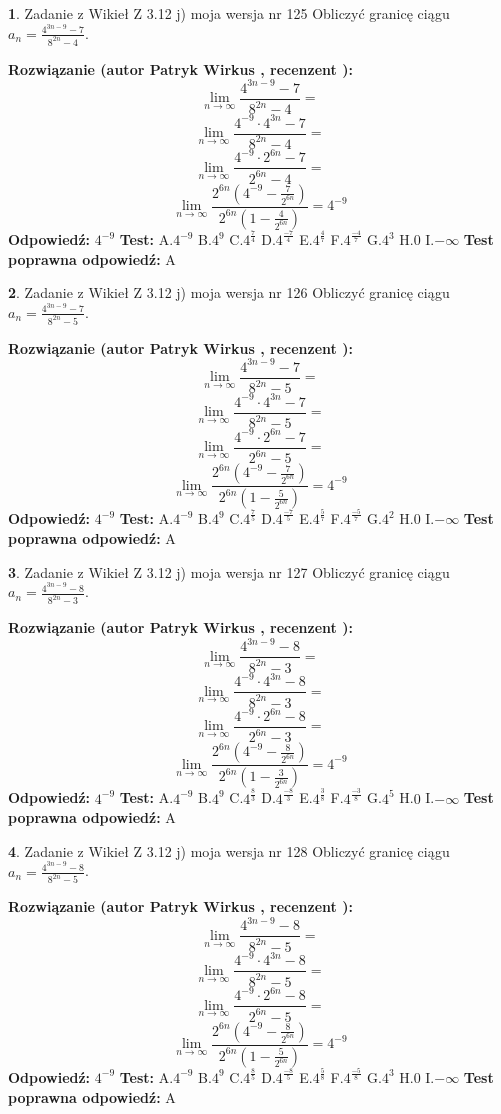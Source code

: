 \documentclass[12pt, a4paper]{article}
\theoremstyle{definition} %
\newtheorem{zad}{}
\newcommand{\zadStart}[1]{\begin{zad}#1\newline}
\newcommand{\zadStop}{\end{zad}}
\newcommand{\rozwStart}[2]{\noindent \textbf{Rozwiązanie (autor #1 , recenzent #2): }\newline}
\newcommand{\rozwStop}{\newline}
\newcommand{\odpStart}{\noindent \textbf{Odpowiedź:}\newline}
\newcommand{\odpStop}{\newline}
\newcommand{\testStart}{\noindent \textbf{Test:}\newline}
\newcommand{\testStop}{\newline}
\newcommand{\kluczStart}{\noindent \textbf{Test poprawna odpowiedź:}\newline}
\newcommand{\kluczStop}{\newline}
\begin{document}
\zadStart{Zadanie z Wikieł Z 3.12 j) moja wersja nr 125}
Obliczyć granicę ciągu $a_{n}=\frac{4^{3n-9}-7}{8^{2n}-4}$.
\zadStop
\rozwStart{Patryk Wirkus}{}
$$\lim\limits_{n\to\infty}\frac{4^{3n-9}-7}{8^{2n}-4}=$$
$$\lim\limits_{n\to\infty}\frac{4^{-9} \cdot 4^{3n}-7}{8^{2n}-4}=$$
$$\lim\limits_{n\to\infty}\frac{4^{-9} \cdot 2^{6n}-7}{2^{6n}-4}=$$
$$\lim\limits_{n\to\infty}\frac{2^{6n}(4^{-9} - \frac{7}{2^{6n}})}{2^{6n}(1-\frac{4}{2^{6n}})}= 4^{-9}$$
\rozwStop
\odpStart
$4^{-9}$
\odpStop
\testStart
A.$4^{-9}$
B.$4^{9}$
C.$4^{\frac{7}{4}}$
D.$4^{\frac{-7}{4}}$
E.$4^{\frac{4}{7}}$
F.$4^{\frac{-4}{7}}$
G.$4^{3}$
H.$0$
I.$-\infty$
\testStop
\kluczStart
A
\kluczStop



\zadStart{Zadanie z Wikieł Z 3.12 j) moja wersja nr 126}
Obliczyć granicę ciągu $a_{n}=\frac{4^{3n-9}-7}{8^{2n}-5}$.
\zadStop
\rozwStart{Patryk Wirkus}{}
$$\lim\limits_{n\to\infty}\frac{4^{3n-9}-7}{8^{2n}-5}=$$
$$\lim\limits_{n\to\infty}\frac{4^{-9} \cdot 4^{3n}-7}{8^{2n}-5}=$$
$$\lim\limits_{n\to\infty}\frac{4^{-9} \cdot 2^{6n}-7}{2^{6n}-5}=$$
$$\lim\limits_{n\to\infty}\frac{2^{6n}(4^{-9} - \frac{7}{2^{6n}})}{2^{6n}(1-\frac{5}{2^{6n}})}= 4^{-9}$$
\rozwStop
\odpStart
$4^{-9}$
\odpStop
\testStart
A.$4^{-9}$
B.$4^{9}$
C.$4^{\frac{7}{5}}$
D.$4^{\frac{-7}{5}}$
E.$4^{\frac{5}{7}}$
F.$4^{\frac{-5}{7}}$
G.$4^{2}$
H.$0$
I.$-\infty$
\testStop
\kluczStart
A
\kluczStop



\zadStart{Zadanie z Wikieł Z 3.12 j) moja wersja nr 127}
Obliczyć granicę ciągu $a_{n}=\frac{4^{3n-9}-8}{8^{2n}-3}$.
\zadStop
\rozwStart{Patryk Wirkus}{}
$$\lim\limits_{n\to\infty}\frac{4^{3n-9}-8}{8^{2n}-3}=$$
$$\lim\limits_{n\to\infty}\frac{4^{-9} \cdot 4^{3n}-8}{8^{2n}-3}=$$
$$\lim\limits_{n\to\infty}\frac{4^{-9} \cdot 2^{6n}-8}{2^{6n}-3}=$$
$$\lim\limits_{n\to\infty}\frac{2^{6n}(4^{-9} - \frac{8}{2^{6n}})}{2^{6n}(1-\frac{3}{2^{6n}})}= 4^{-9}$$
\rozwStop
\odpStart
$4^{-9}$
\odpStop
\testStart
A.$4^{-9}$
B.$4^{9}$
C.$4^{\frac{8}{3}}$
D.$4^{\frac{-8}{3}}$
E.$4^{\frac{3}{8}}$
F.$4^{\frac{-3}{8}}$
G.$4^{5}$
H.$0$
I.$-\infty$
\testStop
\kluczStart
A
\kluczStop



\zadStart{Zadanie z Wikieł Z 3.12 j) moja wersja nr 128}
Obliczyć granicę ciągu $a_{n}=\frac{4^{3n-9}-8}{8^{2n}-5}$.
\zadStop
\rozwStart{Patryk Wirkus}{}
$$\lim\limits_{n\to\infty}\frac{4^{3n-9}-8}{8^{2n}-5}=$$
$$\lim\limits_{n\to\infty}\frac{4^{-9} \cdot 4^{3n}-8}{8^{2n}-5}=$$
$$\lim\limits_{n\to\infty}\frac{4^{-9} \cdot 2^{6n}-8}{2^{6n}-5}=$$
$$\lim\limits_{n\to\infty}\frac{2^{6n}(4^{-9} - \frac{8}{2^{6n}})}{2^{6n}(1-\frac{5}{2^{6n}})}= 4^{-9}$$
\rozwStop
\odpStart
$4^{-9}$
\odpStop
\testStart
A.$4^{-9}$
B.$4^{9}$
C.$4^{\frac{8}{5}}$
D.$4^{\frac{-8}{5}}$
E.$4^{\frac{5}{8}}$
F.$4^{\frac{-5}{8}}$
G.$4^{3}$
H.$0$
I.$-\infty$
\testStop
\kluczStart
A
\kluczStop
\end{document}
